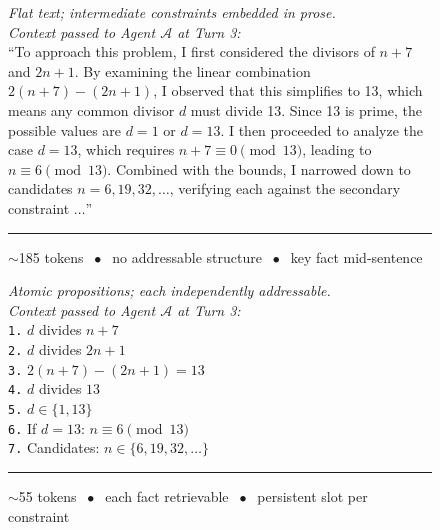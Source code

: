 \begin{figure}[!t]
\centering

\noindent
\begin{minipage}[t]{0.48\textwidth}
\begin{mdframed}[
    frametitle={\textbf{Baseline: Natural-Language Summary}},
    frametitlerule=true,
    frametitlebackgroundcolor=gray!15,
    backgroundcolor=gray!3,
    innertopmargin=6pt, innerbottommargin=6pt
]
\scriptsize\textit{Flat text; intermediate constraints embedded in prose.}\\[4pt]
\small
\textit{Context passed to Agent $\mathcal{A}$ at Turn 3:}\\[4pt]
``To approach this problem, I first considered the divisors of $n+7$ and $2n+1$. By examining the linear combination $2(n+7) - (2n+1)$, I observed that this simplifies to 13, which means \colorbox{yellow!40}{any common divisor $d$ must divide 13}. Since 13 is prime, the possible values are $d=1$ or $d=13$. I then proceeded to analyze the case $d=13$, which requires $n+7 \equiv 0 \pmod{13}$, leading to $n \equiv 6 \pmod{13}$. Combined with the bounds, I narrowed down to candidates $n = 6, 19, 32, \ldots$, verifying each against the secondary constraint $\ldots$''\\[6pt]
\hrule\vspace{4pt}
\scriptsize $\sim$185 tokens $\;\bullet\;$ no addressable structure $\;\bullet\;$ key fact mid-sentence
\end{mdframed}
\end{minipage}
\hfill
\begin{minipage}[t]{0.48\textwidth}
\begin{mdframed}[
    frametitle={\textbf{SLSC: Sparse Logic State}},
    frametitlerule=true,
    frametitlebackgroundcolor=blue!15,
    backgroundcolor=blue!3,
    innertopmargin=6pt, innerbottommargin=6pt
]
\scriptsize\textit{Atomic propositions; each independently addressable.}\\[4pt]
\small
\textit{Context passed to Agent $\mathcal{A}$ at Turn 3:}\\[4pt]
\texttt{1.} $d$ divides $n + 7$\\[2pt]
\texttt{2.} $d$ divides $2n + 1$\\[2pt]
\texttt{3.} $2(n+7) - (2n+1) = 13$\\[2pt]
\texttt{4.} \colorbox{yellow!40}{$d$ divides $13$}\\[2pt]
\texttt{5.} $d \in \{1, 13\}$\\[2pt]
\texttt{6.} If $d = 13$: $n \equiv 6 \pmod{13}$\\[2pt]
\texttt{7.} Candidates: $n \in \{6, 19, 32, \ldots\}$\\[6pt]
\hrule\vspace{4pt}
\scriptsize $\sim$55 tokens $\;\bullet\;$ each fact retrievable $\;\bullet\;$ persistent slot per constraint
\end{mdframed}
\end{minipage}


\end{figure}
